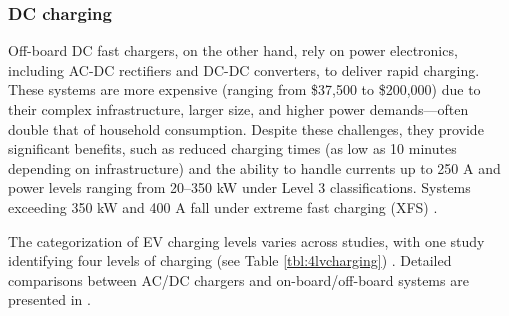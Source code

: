 \documentclass{thesis}
\begin{document}
\subsubsection{DC charging}
Off-board DC fast chargers, on the other hand, rely on power electronics, including AC-DC rectifiers and DC-DC converters, to deliver rapid charging. These systems are more expensive (ranging from \$37,500 to \$200,000) due to their complex infrastructure, larger size, and higher power demands—often double that of household consumption. Despite these challenges, they provide significant benefits, such as reduced charging times (as low as 10 minutes depending on infrastructure) and the ability to handle currents up to 250 A and power levels ranging from 20–350 kW under Level 3 classifications. Systems exceeding 350 kW and 400 A fall under extreme fast charging (XFS) \cite{34_in_EVCM}.

The categorization of EV charging levels varies across studies, with one study \cite{28_in_EVCM} identifying four levels of charging (see Table \ref{tbl:4lvcharging}) \cite{EVCM}. Detailed comparisons between AC/DC chargers and on-board/off-board systems are presented in \cite{32_in_EVCM,34_in_EVCM}.
\end{document}
